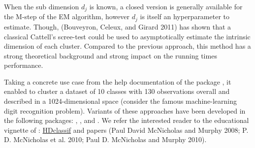 When the sub dimension \(d_j\) is known, a closed version is generally available for the M-step of the EM algorithm, however \(d_j\) is itself an hyperparameter to estimate. Though, (Bouveyron, Celeux, and Girard 2011) has shown that a classical Cattell's scree-test could be used to asymptotically estimate the intrinsic dimension of each cluster. Compared to the previous approach, this method has a strong theoretical background and strong impact on the running times performance.

Taking a concrete use case from the help documentation of the package , it enabled to cluster a dataset of 10 classes with 130 observations overall and described in a 1024-dimensional space (consider the famous machine-learning digit recognition problem). Variants of these approaches have been developed in the following packages: , ,  and . We refer the interested reader to the educational vignette of : \href{https://rdrr.io/pkg/HDclassif/man/HDclassif-package.html}{HDclassif} and papers (Paul David McNicholas and Murphy 2008; P. D. McNicholas et al. 2010; Paul D. McNicholas and Murphy 2010).

